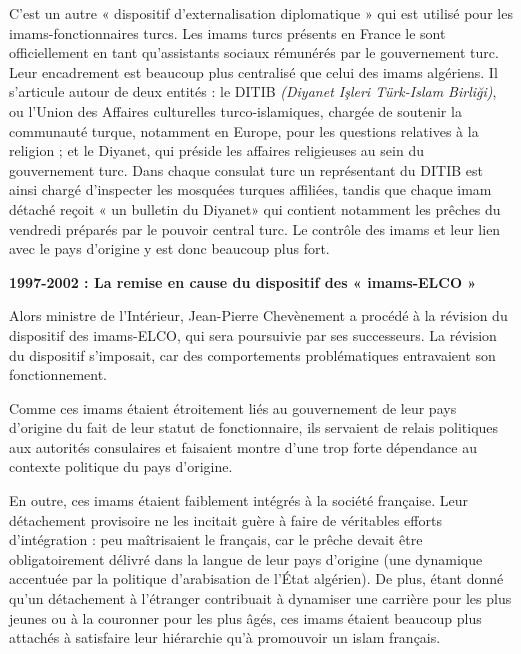 C'est un autre « dispositif d'externalisation diplomatique » qui est
utilisé pour les imams-fonctionnaires turcs. Les imams turcs présents en
France le sont officiellement en tant qu'assistants sociaux rémunérés
par le gouvernement turc. Leur encadrement est beaucoup plus centralisé
que celui des imams algériens. Il s'articule autour de deux entités : le
DITIB \emph{(Diyanet Işleri Türk-Islam Birliği)}, ou l'Union des
Affaires culturelles turco-islamiques, chargée de soutenir la communauté
turque, notamment en Europe, pour les questions relatives à la religion
; et le Diyanet, qui préside les affaires religieuses au sein du
gouvernement turc. Dans chaque consulat turc un représentant du DITIB
est ainsi chargé d'inspecter les mosquées turques affiliées, tandis que
chaque imam détaché reçoit « un bulletin du Diyanet» qui contient
notamment les prêches du vendredi préparés par le pouvoir central turc.
Le contrôle des imams et leur lien avec le pays d'origine y est donc
beaucoup plus fort.

\textbf{1997-2002 : La remise en cause du dispositif des « imams-ELCO »}

Alors ministre de l'Intérieur, Jean-Pierre Chevènement a procédé à la
révision du dispositif des imams-ELCO, qui sera poursuivie par ses
successeurs. La révision du dispositif s'imposait, car des comportements
problématiques entravaient son fonctionnement.

Comme ces imams étaient étroitement liés au gouvernement de leur pays
d'origine du fait de leur statut de fonctionnaire, ils servaient de
relais politiques aux autorités consulaires et faisaient montre d'une
trop forte dépendance au contexte politique du pays d'origine.

En outre, ces imams étaient faiblement intégrés à la société française.
Leur détachement provisoire ne les incitait guère à faire de véritables
efforts d'intégration : peu maîtrisaient le français, car le prêche
devait être obligatoirement délivré dans la langue de leur pays
d'origine (une dynamique accentuée par la politique d'arabisation de
l'État algérien). De plus, étant donné qu'un détachement à l'étranger
contribuait à dynamiser une carrière pour les plus jeunes ou à la
couronner pour les plus âgés, ces imams étaient beaucoup plus attachés à
satisfaire leur hiérarchie qu'à promouvoir un islam français.

